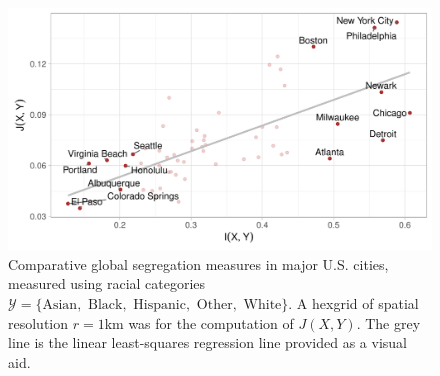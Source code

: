 \documentclass[9pt,twocolumn,twoside]{pnas-new}
\begin{document}
	\begin{figure}
		\includegraphics[width=\linewidth]{figs/mutual_fisher.pdf}
		\caption{
			Comparative global segregation measures in major U.S. cities, measured using racial categories $\mathcal{Y} = \{\text{Asian}, \text{ Black}, \text{ Hispanic}, \text{ Other}, \text{ White}\}$. 
			A hexgrid of spatial resolution $r = 1$km was for the computation of $J(X,Y)$. The grey line is the linear least-squares regression line provided as a visual aid. 
		} \label{fig:mutual_fisher}
	\end{figure}
\end{document}
